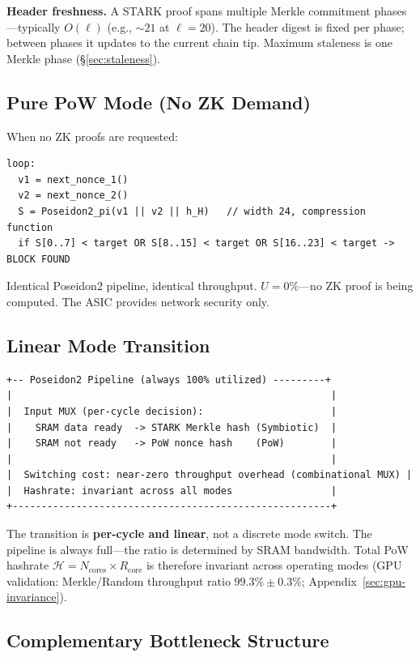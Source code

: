 \documentclass[11pt,a4paper]{article}
\begin{document}
\textbf{Header freshness.} A STARK proof spans multiple Merkle commitment phases---typically $O(\ell)$ (e.g., ${\sim}21$ at $\ell = 20$). The header digest is fixed per phase; between phases it updates to the current chain tip. Maximum staleness is one Merkle phase (\S\ref{sec:staleness}).

\subsection{Pure PoW Mode (No ZK Demand)}
\label{sec:pure-pow}

When no ZK proofs are requested:
\begin{Verbatim}[fontsize=\small]
loop:
  v1 = next_nonce_1()
  v2 = next_nonce_2()
  S = Poseidon2_pi(v1 || v2 || h_H)   // width 24, compression function
  if S[0..7] < target OR S[8..15] < target OR S[16..23] < target -> BLOCK FOUND
\end{Verbatim}

Identical Poseidon2 pipeline, identical throughput. $U = 0\%$---no ZK proof is being computed. The ASIC provides network security only.

\subsection{Linear Mode Transition}
\label{sec:transition}

\begin{Verbatim}[fontsize=\small]
+-- Poseidon2 Pipeline (always 100% utilized) ---------+
|                                                       |
|  Input MUX (per-cycle decision):                      |
|    SRAM data ready  -> STARK Merkle hash (Symbiotic)  |
|    SRAM not ready   -> PoW nonce hash    (PoW)        |
|                                                       |
|  Switching cost: near-zero throughput overhead (combinational MUX) |
|  Hashrate: invariant across all modes                 |
+-------------------------------------------------------+
\end{Verbatim}

The transition is \textbf{per-cycle and linear}, not a discrete mode switch. The pipeline is always full---the ratio is determined by SRAM bandwidth. Total PoW hashrate $\mathcal{H} = N_{\mathrm{cores}} \times R_{\mathrm{core}}$ is therefore invariant across operating modes (GPU validation: Merkle/Random throughput ratio $99.3\% \pm 0.3\%$; Appendix~\ref{sec:gpu-invariance}).

\subsection{Complementary Bottleneck Structure}
\label{sec:bottleneck}
\end{document}
